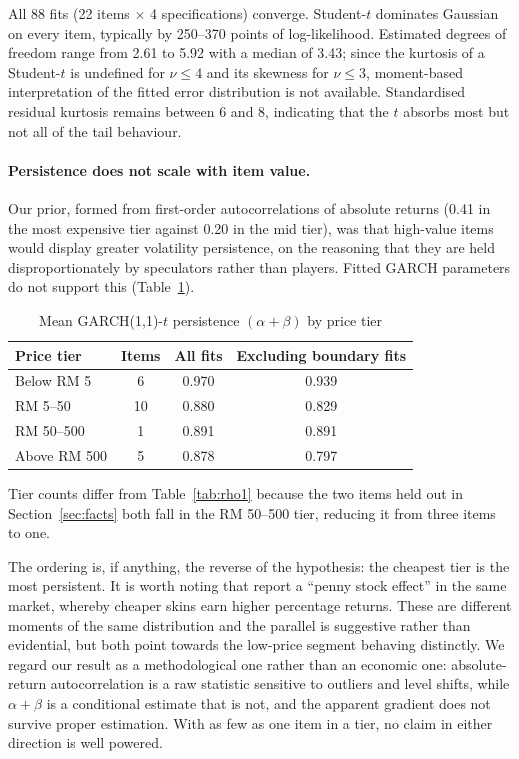 \documentclass[11pt,a4paper]{article}
\begin{document}
All 88 fits (22 items $\times$ 4 specifications) converge. Student-$t$
dominates Gaussian on every item, typically by 250--370 points of
log-likelihood. Estimated degrees of freedom range from 2.61 to 5.92 with a
median of 3.43; since the kurtosis of a Student-$t$ is undefined for
$\nu \leq 4$ and its skewness for $\nu \leq 3$, moment-based interpretation of
the fitted error distribution is not available. Standardised residual
kurtosis remains between 6 and 8, indicating that the $t$ absorbs most but not
all of the tail behaviour.

\paragraph{Persistence does not scale with item value.}
Our prior, formed from first-order autocorrelations of absolute returns
(0.41 in the most expensive tier against 0.20 in the mid tier), was that
high-value items would display greater volatility persistence, on the reasoning
that they are held disproportionately by speculators rather than players.
Fitted GARCH parameters do not support this (Table~\ref{tab:persist}).

\begin{table}[htbp]
\centering
\caption{Mean GARCH(1,1)-$t$ persistence $(\alpha+\beta)$ by price tier}
\label{tab:persist}
\begin{tabular}{lccc}
\toprule
Price tier & Items & All fits & Excluding boundary fits \\
\midrule
Below RM 5      & 6  & 0.970 & 0.939 \\
RM 5--50        & 10 & 0.880 & 0.829 \\
RM 50--500      & 1  & 0.891 & 0.891 \\
Above RM 500    & 5  & 0.878 & 0.797 \\
\bottomrule
\end{tabular}

\medskip
\begin{minipage}{0.92\textwidth}
\footnotesize Tier counts differ from Table~\ref{tab:rho1} because the two
items held out in Section~\ref{sec:facts} both fall in the RM 50--500 tier,
reducing it from three items to one.
\end{minipage}
\end{table}

The ordering is, if anything, the reverse of the hypothesis: the cheapest tier
is the most persistent. It is worth noting that \citet{Dobrynskaya2025} report
a ``penny stock effect'' in the same market, whereby cheaper skins earn higher
percentage returns. These are different moments of the same distribution and
the parallel is suggestive rather than evidential, but both point towards the
low-price segment behaving distinctly. We regard our result as a
methodological one rather than an economic one: absolute-return
autocorrelation is a raw statistic sensitive to outliers and level shifts,
while $\alpha+\beta$ is a conditional estimate that is not, and the apparent
gradient does not survive proper estimation. With as few as one item in a tier,
no claim in either direction is well powered.
\end{document}
